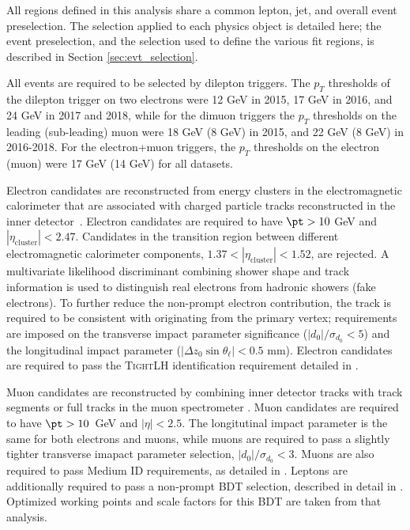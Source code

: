 
All regions defined in this analysis share a common lepton, jet, and overall event preselection. The selection applied to each physics object is detailed here; the event preselection, and the selection used to define the various fit regions, is described in Section \ref{sec:evt_selection}.

All events are required to be selected by dilepton triggers. The $p_T$ thresholds of the dilepton trigger on two electrons were 12 GeV in 2015, 17 GeV in 2016, and 24 GeV in 2017 and 2018, while for the dimuon triggers the $p_T$ thresholds on the leading (sub-leading) muon were 18 GeV (8 GeV) in 2015, and 22 GeV (8 GeV) in 2016-2018. For the electron+muon triggers, the $p_T$ thresholds on the electron (muon) were 17 GeV (14 GeV) for all datasets.

Electron candidates are reconstructed from energy clusters in the electromagnetic calorimeter that are associated with charged particle tracks reconstructed in the inner detector~\cite{ele_eff}. Electron candidates are required to have $\pt > 10$ GeV and $|\eta_\textrm{cluster}| < 2.47$. Candidates in the transition region between different electromagnetic calorimeter components, $1.37 < |\eta_\textrm{cluster}| < 1.52$, are rejected. A multivariate likelihood discriminant combining shower shape and track information is used to distinguish real electrons from hadronic showers (fake electrons). To further reduce the non-prompt electron contribution, the track is required to be consistent with originating from the primary vertex; requirements are imposed on the transverse impact parameter significance ($|d_0|/\sigma_{d_0}<5$) and the longitudinal impact parameter ($|\Delta z_0 \sin \theta_\ell| < 0.5$ mm). Electron candidates are required to pass the \textsc{TightLH} identification requirement detailed in \cite{Aad:2014fxa}.
                   
Muon candidates are reconstructed by combining inner detector tracks with track segments or full tracks in the muon spectrometer \cite{PERF-2014-05}. Muon candidates are required to have $\pt > 10$~GeV and $|\eta| < 2.5$. The longitutinal impact parameter is the same for both electrons and muons, while muons are required to pass a slightly tighter transverse imapact parameter selection, $|d_0|/\sigma_{d_0}<3$. Muons are also required to pass Medium ID requirements, as detailed in \cite{Aad:2014fxa}. Leptons are additionally required to pass a non-prompt BDT selection, described in detail in \cite{ttH_comb}. Optimized working points and scale factors for this BDT are taken from that analysis.

